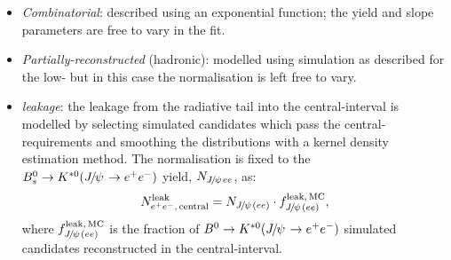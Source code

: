 \begin{itemize}

\item \textit{Combinatorial}: described using an exponential function;
the yield and slope parameters are free to vary in the fit.

\item \textit{Partially-reconstructed} (hadronic): modelled using simulation as described for the low-\qsq 
but in this case the normalisation is left free to vary.

%
%

\item \textit{\BdToKstJPs leakage}: the leakage from the \jpsi radiative tail into the central-\qsq interval is modelled by selecting 
simulated \BdToKstJPsee candidates which pass the central-\qsq requirements and smoothing the distributions
with a kernel density estimation method. The normalisation is fixed to the $\Bs\to\Kstarz(\jpsi\to\ee)$ yield, 
$N_{\jpsi ee}$, as:
%
$$N_{\ee, \, {\rm central}}^{\rm leak} = N_{\jpsi(ee)} \cdot f_{\jpsi(ee)}^{\rm leak, \,MC},$$
%
where $f_{\jpsi(ee)}^{\rm leak, \,MC}$ is the fraction of $\Bd\to\Kstarz(\jpsi\to\ee)$ simulated candidates reconstructed
in the central-\qsq interval.

\end{itemize}

